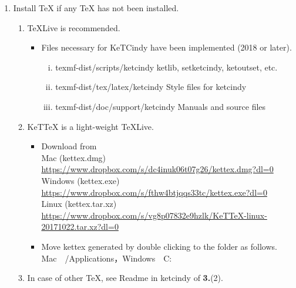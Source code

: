 \documentclass{article}
\begin{document}
\begin{enumerate}[\bf\large 1.]
\begin{itemize}
 \end{itemize}
\item Install TeX if any TeX has not been installed.
 \begin{enumerate}[(1)]
 \item TeXLive is recommended.
    \begin{itemize}
    \item Files necessary for KeTCindy have been implemented (2018 or later).
      \begin{enumerate}[i)]
       \item texmf-dist/scripts/ketcindy   ketlib, setketcindy, ketoutset, etc.
       \item texmf-dist/tex/latex/ketcindy   Style files for ketcindy
       \item texmf-dist/doc/support/ketcindy  Manuals and source files
      \end{enumerate}
    \end{itemize}
 \item KeTTeX is a light-weight TeXLive.
    \begin{itemize}
    \item Download from\\
    \hspace*{5mm}Mac (kettex.dmg)\\
    \hspace*{10mm}\url{https://www.dropbox.com/s/dc4inuk06t07g26/kettex.dmg?dl=0}\\
    \hspace*{5mm}Windows (kettex.exe)\\
    \hspace*{10mm}\url{https://www.dropbox.com/s/fthw4btjqqs33tc/kettex.exe?dl=0}\\
    \hspace*{5mm}Linux (kettex.tar.xz)\\
    \hspace*{10mm}\url{https://www.dropbox.com/s/vg8p07832e9hzlk/KeTTeX-linux-20171022.tar.xz?dl=0}
     \item Move kettex generated by double clicking to the folder as follows.\\
     \hspace*{10mm}Mac\ \ /Applications，Windows\ \ C:\
    \end{itemize}
 \item In case of other TeX, see Readme in ketcindy of {\bf 3.}(2).
 \end{enumerate}


\end{enumerate}
\end{document}
